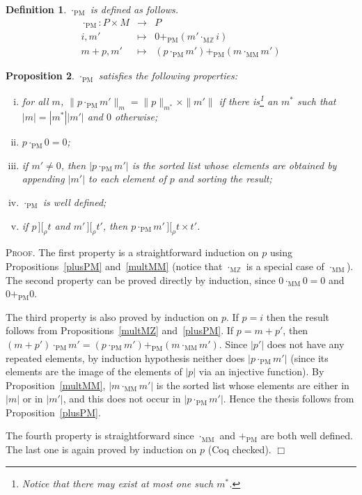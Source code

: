 \documentclass{article}
\newtheorem{definition}{Definition}[section]
\newtheorem{proposition}[definition]{Proposition}
\newenvironment{proof}{\smallskip\textsc{Proof.}}{\hspace*{\fill}$\Box$}
\newcommand{\intII}{\,]\![}
\newcommand{\intrel}{\mathbin{\intII_{\rho}}}
\newcommand{\Z}{{\mathbb Z}}
\newcommand{\coeff}[2]{\ensuremath{\|#2\|_{#1}}}
\newcommand{\multMZ}{\ensuremath{\cdot_{\mathrm M\Z}}}
\newcommand{\multMM}{\ensuremath{\cdot_{\mathrm{MM}}}}
\newcommand{\plusPM}{\ensuremath{+_{\mathrm{PM}}}}
\newcommand{\multPM}{\ensuremath{\cdot_{\mathrm{PM}}}}
\begin{document}
\begin{definition}\label{defn:multPM} {\multPM} is defined as follows.
\begin{eqnarray*}
\multPM : P\times M & \to & P \\
 i, m' & \mapsto & 0\plusPM (m'\multMZ i) \\
 m+p, m' & \mapsto & (p\multPM m')\plusPM (m\multMM m')
\end{eqnarray*}
\end{definition}

\begin{proposition}\label{multPM}
{\multPM} satisfies the following properties:
\begin{enumerate}[(i)]
\item for all $m$, $\coeff m{p\multPM m'}=\coeff{m^\ast}p\times\|m'\|$ if
there is\footnote{Notice that there may exist at most one such $m^\ast$.}
an $m^\ast$ such that $|m|=|m^\ast||m'|$ and $0$ otherwise;
\item $p\multPM 0=0$;
\item if $m'\neq 0$, then $|p\multPM m'|$ is the sorted list whose
elements are obtained by appending $|m'|$ to each element of $p$ and
sorting the result;
\item {\multPM} is well defined;
\item if $p\intrel t$ and $m'\intrel t'$, then $p\multPM m'\intrel t\times t'$.
\end{enumerate}
\end{proposition}
\begin{proof}
The first property is a straightforward induction on $p$ using
Propositions~\ref{plusPM} and~\ref{multMM} (notice that {\multMZ} is
a special case of {\multMM}).  The second property can be proved directly
by induction, since $0\multMM0=0$ and $0\plusPM 0$.

The third property is also proved by induction on $p$.  If $p=i$
then the result follows from Propositions~\ref{multMZ} and~\ref{plusPM}.
If $p=m+p'$, then $(m+p')\multPM m'=(p\multPM m')\plusPM (m\multMM m')$.
Since $|p'|$ does not have any repeated elements, by induction hypothesis
neither does $|p\multPM m'|$ (since its elements are the image of the
elements of $|p|$ via an injective function).  By Proposition~\ref{multMM},
$|m\multMM m'|$ is the sorted list whose elements are either in $|m|$ or in
$|m'|$, and this does not occur in $|p\multPM m'|$.  Hence the thesis
follows from Proposition~\ref{plusPM}.

The fourth property is straightforward since {\multMM} and {\plusPM} are
both well defined.  The last one is again proved by induction on $p$
(Coq checked).
\end{proof}
\end{document}
